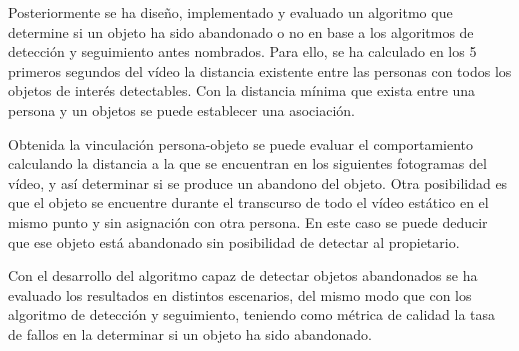 Posteriormente se ha diseño, implementado y evaluado un algoritmo que determine si un objeto ha sido abandonado o no en base a los algoritmos de detección y seguimiento antes nombrados. Para ello, se ha calculado en los 5 primeros segundos del vídeo la distancia existente entre las personas con todos los objetos de interés detectables. Con la distancia mínima que exista entre una persona y un objetos se puede establecer una asociación.

Obtenida la vinculación persona-objeto se puede evaluar el comportamiento calculando la distancia a la que se encuentran en los siguientes fotogramas del vídeo, y así determinar si se produce un abandono del objeto. Otra posibilidad es que el objeto se encuentre durante el transcurso de todo el vídeo estático \cite{luna2018} en el mismo punto y sin asignación con otra persona. En este caso se puede deducir que ese objeto está abandonado sin posibilidad de detectar al propietario.

Con el desarrollo del algoritmo capaz de detectar objetos abandonados se ha evaluado los resultados en distintos escenarios, del mismo modo que con los algoritmo de detección y seguimiento, teniendo como métrica de calidad la tasa de fallos en la determinar si un objeto ha sido abandonado.
